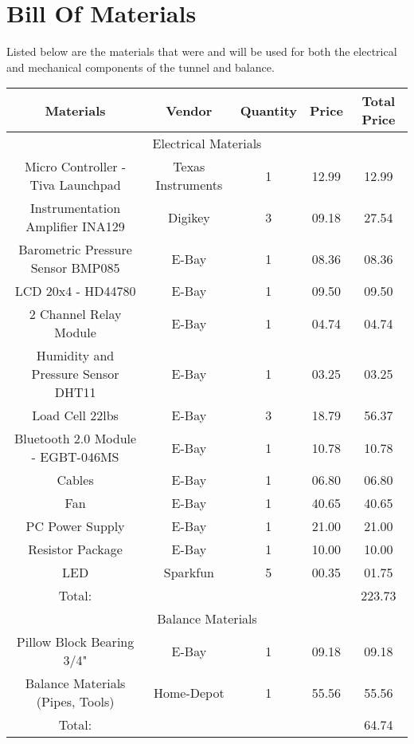 \section{Bill Of Materials}
	Listed below are the materials that were and will be used for both the electrical and mechanical
	components of the tunnel and balance. \\

	\noindent
	\begin{tabular}{|c|c|c|c|c|}
		\hline
			\rowcolor{gray!50} \textbf{Materials} & \textbf{Vendor} & \textbf{Quantity} & \textbf{Price} & \textbf{Total Price}  \\
		\hline
			\multicolumn{5}{|c|}{Electrical Materials} \\
		\hline
			Micro Controller - Tiva Launchpad 	& Texas Instruments 	& 1 & 12.99 & 12.99 \\
			Instrumentation Amplifier INA129 	& Digikey 				& 3 & 09.18 & 27.54 \\
			Barometric Pressure Sensor BMP085 	& E-Bay 				& 1 & 08.36 & 08.36 \\
			LCD 20x4 - HD44780				 	& E-Bay 				& 1 & 09.50 & 09.50 \\
			2 Channel Relay Module			 	& E-Bay 				& 1 & 04.74 & 04.74 \\
			Humidity and Pressure Sensor DHT11	& E-Bay 				& 1 & 03.25 & 03.25 \\
			Load Cell 22lbs						& E-Bay					& 3 & 18.79 & 56.37 \\
			Bluetooth 2.0 Module - EGBT-046MS	& E-Bay					& 1 & 10.78 & 10.78 \\
			Cables								& E-Bay					& 1 & 06.80 & 06.80 \\
			Fan									& E-Bay					& 1 & 40.65 & 40.65 \\
			PC Power Supply						& E-Bay					& 1 & 21.00 & 21.00 \\
			Resistor Package					& E-Bay					& 1 & 10.00	& 10.00 \\
			LED									& Sparkfun				& 5 & 00.35 & 01.75 \\
		\hline
			Total:								&						&	&		& 223.73 \\
		\hline
			\multicolumn{5}{|c|}{Balance Materials} \\
		\hline
			Pillow Block Bearing 3/4"			& E-Bay					& 1 & 09.18 & 09.18 \\
			Balance Materials (Pipes, Tools)	& Home-Depot			& 1 & 55.56 & 55.56 \\
		\hline
			Total:								&						&	&		& 64.74 \\
		\hline
	\end{tabular} \\


\newpage
